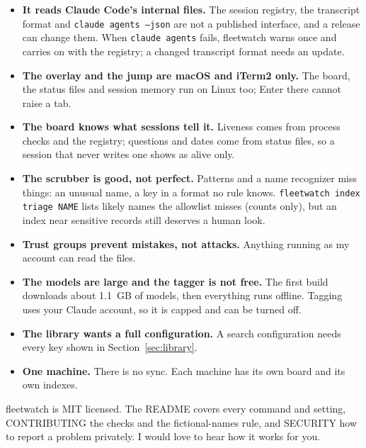 \documentclass[11pt, letterpaper]{article}
\newcommand{\cmd}[1]{\texttt{#1}}
\begin{document}
\begin{itemize}
  \item \textbf{It reads Claude Code's internal files.} The session registry, the transcript
    format and \cmd{claude agents --json} are not a published interface, and a release can
    change them. When \cmd{claude agents} fails, fleetwatch warns once and carries on with the
    registry; a changed transcript format needs an update.
  \item \textbf{The overlay and the jump are macOS and iTerm2 only.} The board, the status
    files and session memory run on Linux too; Enter there cannot raise a tab.
  \item \textbf{The board knows what sessions tell it.} Liveness comes from process checks
    and the registry; questions and dates come from status files, so a session that never
    writes one shows as alive only.
  \item \textbf{The scrubber is good, not perfect.} Patterns and a name recognizer miss
    things: an unusual name, a key in a format no rule knows. \cmd{fleetwatch index triage
    NAME} lists likely names the allowlist misses (counts only), but an index near sensitive
    records still deserves a human look.
  \item \textbf{Trust groups prevent mistakes, not attacks.} Anything running as my account
    can read the files.
  \item \textbf{The models are large and the tagger is not free.} The first build downloads
    about 1.1~GB of models, then everything runs offline. Tagging uses your Claude
    account, so it is capped and can be turned off.
  \item \textbf{The library wants a full configuration.} A search configuration needs every key
    shown in Section~\ref{sec:library}.
  \item \textbf{One machine.} There is no sync. Each machine has its own board and its own
    indexes.
\end{itemize}

fleetwatch is MIT licensed. The README covers every command and setting, CONTRIBUTING the
checks and the fictional-names rule, and SECURITY how to report a problem privately. I would
love to hear how it works for you.
\end{document}
